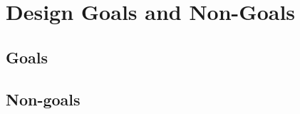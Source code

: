 \section{Design Goals and Non-Goals}
\label{sec:goals}


\subsection{Goals}

\subsection{Non-goals}

